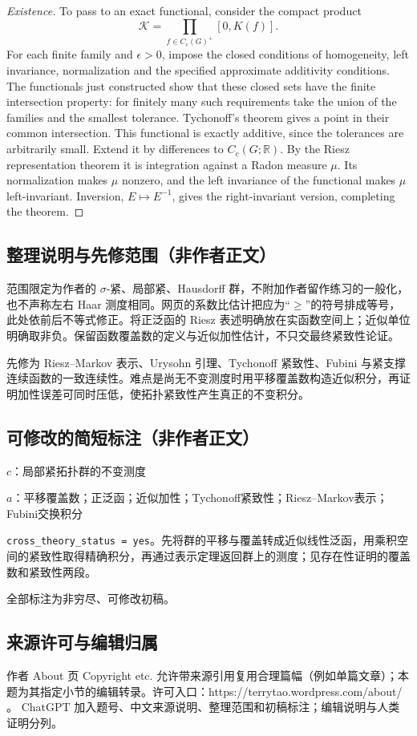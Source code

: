 \documentclass[UTF8,11pt]{ctexart}
\theoremstyle{definition}
\newcommand{\R}{\mathbb R}
\begin{document}
\begin{proof}[Existence]
To pass to an exact functional, consider the compact product
\[
 \mathcal K=\prod_{f\in C_c(G)^+}[0,K(f)].
\]
For each finite family and $\epsilon>0$, impose the closed conditions of
homogeneity, left invariance, normalization and the specified approximate
additivity conditions. The functionals just constructed show that these
closed sets have the finite intersection property: for finitely many such
requirements take the union of the families and the smallest tolerance.
Tychonoff's theorem gives a point in their common intersection. This
functional is exactly additive, since the tolerances are arbitrarily small.
Extend it by differences to $C_c(G;\R)$. By the Riesz representation theorem
it is integration against a Radon measure $\mu$. Its normalization makes
$\mu$ nonzero, and the left invariance of the functional makes $\mu$
left-invariant. Inversion, $E\mapsto E^{-1}$, gives the right-invariant
version, completing the theorem.
\end{proof}

\subsection*{整理说明与先修范围（非作者正文）}
范围限定为作者的 $\sigma$-紧、局部紧、Hausdorff 群，不附加作者留作练习的一般化，也不声称左右 Haar 测度相同。网页的系数比估计把应为“$\geq$”的符号排成等号，此处依前后不等式修正。将正泛函的 Riesz 表述明确放在实函数空间上；近似单位明确取非负。保留函数覆盖数的定义与近似加性估计，不只交最终紧致性论证。

先修为 Riesz--Markov 表示、Urysohn 引理、Tychonoff 紧致性、Fubini 与紧支撑连续函数的一致连续性。难点是尚无不变测度时用平移覆盖数构造近似积分，再证明加性误差可同时压低，使拓扑紧致性产生真正的不变积分。
\subsection*{可修改的简短标注（非作者正文）}
$c$：局部紧拓扑群的不变测度

$a$：平移覆盖数；正泛函；近似加性；Tychonoff紧致性；Riesz--Markov表示；Fubini交换积分

\texttt{cross\_theory\_status = yes}。先将群的平移与覆盖转成近似线性泛函，用乘积空间的紧致性取得精确积分，再通过表示定理返回群上的测度；见存在性证明的覆盖数和紧致性两段。

全部标注为非穷尽、可修改初稿。
\subsection*{来源许可与编辑归属}
作者 About 页 Copyright etc. 允许带来源引用复用合理篇幅（例如单篇文章）；本题为其指定小节的编辑转录。许可入口：https://terrytao.wordpress.com/about/ 。
ChatGPT 加入题号、中文来源说明、整理范围和初稿标注；编辑说明与人类证明分列。
\end{document}
